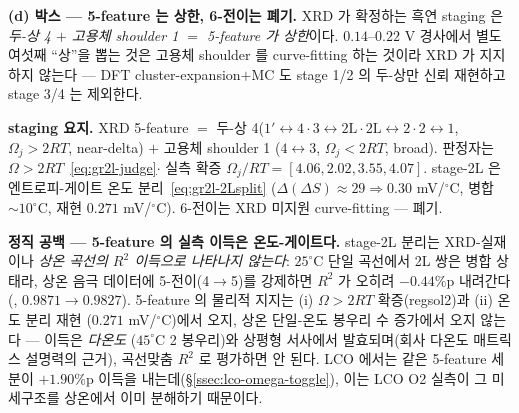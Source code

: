 \textbf{(d) 박스 --- 5-feature 는 상한, 6-전이는 폐기.}
XRD 가 확정하는 흑연 staging 은 \emph{두-상 4 $+$ 고용체 shoulder 1 $=$ 5-feature 가 상한}이다. $0.14$--$0.22$ V
경사에서 별도 여섯째 ``상''을 뽑는 것은 고용체 shoulder 를 curve-fitting 하는 것이라 XRD 가 지지하지 않는다
--- DFT cluster-expansion$+$MC 도 stage 1/2 의 두-상만 신뢰 재현하고 stage 3/4 는 제외한다\cite{persson2010}.
\begin{keybox}
\textbf{staging 요지.} XRD 5-feature $=$ 두-상 4($1'\!\leftrightarrow\!4\cdot3\!\leftrightarrow\!2\mathrm L\cdot
2\mathrm L\!\leftrightarrow\!2\cdot2\!\leftrightarrow\!1$, $\Omega_j\!>\!2RT$, near-delta) $+$ 고용체 shoulder 1
($4\!\leftrightarrow\!3$, $\Omega_j\!<\!2RT$, broad). 판정자는 $\Omega\!>\!2RT$~\eqref{eq:gr2l-judge}$\cdot$
실측 확증 $\Omega_j/RT\!=\![4.06,2.02,3.55,4.07]$. stage-2L 은 엔트로피-게이트 온도 분리~\eqref{eq:gr2l-2Lsplit}
($\Delta(\Delta S)\!\approx\!29\Rightarrow0.30$ mV/$^\circ$C, 병합 $\sim10^\circ$C, 재현 $0.271$ mV/$^\circ$C).
6-전이는 XRD 미지원 curve-fitting --- 폐기.
\end{keybox}

\begin{warnbox}
\textbf{정직 공백 --- 5-feature 의 실측 이득은 온도-게이트다.} stage-2L 분리는 XRD-실재이나 \emph{상온
곡선의 $R^2$ 이득으로 나타나지 않는다}: $25^\circ$C 단일 곡선에서 2L 쌍은 병합 상태라, 상온 음극 데이터에
5-전이(4$\to$5)를 강제하면 $R^2$ 가 오히려 $-0.44$\%p 내려간다(,
$0.9871\!\to\!0.9827$). 5-feature 의 물리적 지지는 (i) $\Omega>2RT$ 확증(regsol2)과 (ii) 온도 분리 재현
($0.271$ mV/$^\circ$C)에서 오지, 상온 단일-온도 봉우리 수 증가에서 오지 않는다 --- 이득은 \emph{다온도}
($45^\circ$C 2 봉우리)와 상평형 서사에서 발효되며(회사 다온도 매트릭스 설명력의 근거), 곡선맞춤 $R^2$ 로
평가하면 안 된다. LCO 에서는 같은 5-feature 세분이 $+1.90$\%p 이득을 내는데(\S\ref{ssec:lco-omega-toggle}),
이는 LCO O2 실측이 그 미세구조를 상온에서 이미 분해하기 때문이다.
\end{warnbox}

